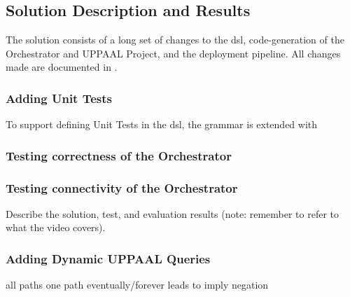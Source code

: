 \subsection{Solution Description and Results}

The solution consists of a long set of changes to the \acrshort{dsl}, code-generation of the Orchestrator and UPPAAL Project, and the deployment pipeline. All changes made are documented in .

\subsubsection{Adding Unit Tests}

To support defining Unit Tests in the \acrshort{dsl}, the grammar is extended with 

\subsubsection*{Testing correctness of the Orchestrator}

\subsubsection*{Testing connectivity of the Orchestrator}

Describe the solution, test, and evaluation results (note: remember to refer to what the video covers).

\subsubsection{Adding Dynamic UPPAAL Queries}

all paths
one path
eventually/forever
leads to
imply
negation



